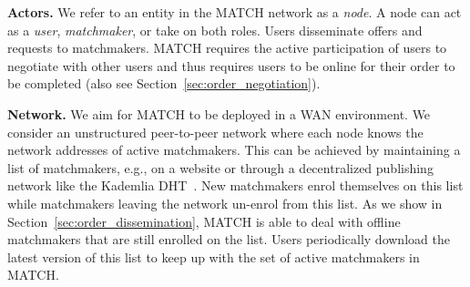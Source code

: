 \textbf{Actors.}
We refer to an entity in the MATCH network as a \emph{node}.
A node can act as a \emph{user}, \emph{matchmaker}, or take on both roles.
Users disseminate offers and requests to matchmakers.
MATCH requires the active participation of users to negotiate with other users and thus requires users to be online for their order to be completed (also see Section~\ref{sec:order_negotiation}).



\textbf{Network.}
We aim for MATCH to be deployed in a WAN environment.
We consider an unstructured peer-to-peer network where each node knows the network addresses of active matchmakers.
This can be achieved by maintaining a list of matchmakers, e.g., on a website or through a decentralized publishing network like the Kademlia DHT~\cite{maymounkov2002kademlia}.
New matchmakers enrol themselves on this list while matchmakers leaving the network un-enrol from this list.
As we show in Section~\ref{sec:order_dissemination}, MATCH is able to deal with offline matchmakers that are still enrolled on the list.
Users periodically download the latest version of this list to keep up with the set of active matchmakers in MATCH.

